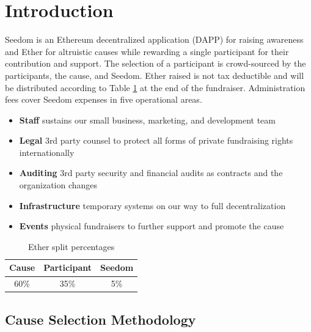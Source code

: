 \documentclass[11pt]{article}
\begin{document}
\tableofcontents
\pagebreak

\section{Introduction}

Seedom is an Ethereum decentralized application (DAPP) for raising awareness and Ether for altruistic causes while rewarding a single participant for their contribution and support. The selection of a participant is crowd-sourced by the participants, the cause, and Seedom. Ether raised is not tax deductible and will be distributed according to Table \ref{tab:etherSplitPercentages} at the end of the fundraiser. Administration fees cover Seedom expenses in five operational areas.

\begin{itemize}
\item{\textbf{Staff} sustains our small business, marketing, and development team}
\item{\textbf{Legal} 3rd party counsel to protect all forms of private fundraising rights internationally}
\item{\textbf{Auditing} 3rd party security and financial audits as contracts and the organization changes}
\item{\textbf{Infrastructure} temporary systems on our way to full decentralization}
\item{\textbf{Events} physical fundraisers to further support and promote the cause}
\end{itemize}

\begin{table}[H]
\begin{center}
\begin{tabular}{| c | c | c |}
\hline
\textbf{Cause} & \textbf{Participant} & \textbf{Seedom} \\ \hline
60\% & 35\%  & 5\% \\ \hline
\end{tabular}
\caption{Ether split percentages}
\label{tab:etherSplitPercentages}
\end{center}
\end{table}

\subsection{Cause Selection Methodology}
\end{document}
